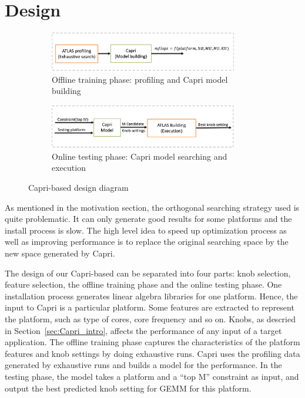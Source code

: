 \section{Design}
\label{sec:design}

\begin{figure}[tbhp]
  \centering
  \begin{subfigure}[b]{1.0\linewidth}
    \centering
    \includegraphics[width=0.9\textwidth]{images/offline_training.png}
    \caption{Offline training phase: \atl profiling and Capri model building}
    \label{fig:design_train}
  \end{subfigure}
  \begin{subfigure}[b]{1.0\linewidth}
    \centering
    \includegraphics[width=0.9\textwidth]{images/testing.png}
    \caption{Online testing phase: Capri model searching and \atl execution}
    \label{fig:design_test}
  \end{subfigure}
  \caption{Capri-based \atl design diagram}
\end{figure}

As mentioned in the motivation section, the orthogonal searching strategy used
\atl is quite problematic. It can only generate good results for some platforms
and the install process is slow. The high level idea to speed up \atl
optimization process as well as improving \gem performance is to replace the
original searching space by the new space generated by Capri.

The design of our Capri-based \atl can be separated into four parts: knob
selection, feature selection, the offline training phase and the online testing
phase. One \atl installation process generates linear algebra libraries for one
platform. Hence, the input to Capri is a particular platform. Some features are
extracted to represent the platform, such as type of cores, core frequency and
so on. Knobs, as descried in Section~\ref{sec:Capri_intro}, affects the
performance of any input of a target application. The offline training phase
captures the characteristics of the platform features and knob settings by doing
exhaustive runs. Capri uses the profiling data generated by exhaustive runs and
builds a model for the \gem performance. In the testing phase, the model takes
a platform and a ``top M'' constraint as input, and output the best predicted
knob setting for GEMM for this platform.

